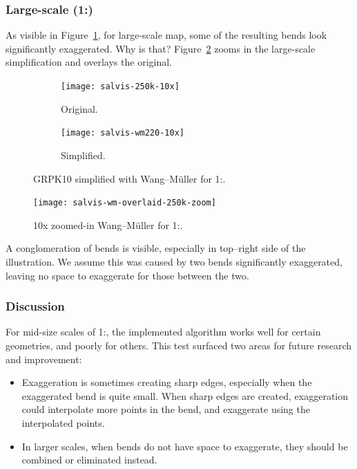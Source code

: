\documentclass[a4paper]{article}
\newcommand{\WM}{Wang--M{\"u}ller}
\begin{document}
\clearpage

\subsubsection{Large-scale (1:)}
\label{sec:analyzed-large-scale}

As visible in Figure~\ref{fig:salvis-wm220-10x}, for large-scale map, some of the
resulting bends look significantly exaggerated. Why is that?
Figure~\ref{fig:salvis-wm220-overlaid-zoom} zooms in the large-scale
simplification and overlays the original.

\begin{figure}[ht]
    \centering
    \begin{subfigure}[b]{.49\textwidth}
        \centering
        \texttt{[image: salvis-250k-10x]}
        \caption{Original.}
    \end{subfigure}
    \hfill
    \begin{subfigure}[b]{.49\textwidth}
        \centering
        \texttt{[image: salvis-wm220-10x]}
        \caption{Simplified.}
    \end{subfigure}
    \caption{GRPK10 simplified with {\WM} for 1:.}
    \label{fig:salvis-wm220-10x}
\end{figure}

\begin{figure}[ht]
    \centering
    \texttt{[image: salvis-wm-overlaid-250k-zoom]}
    \caption{10x zoomed-in {\WM} for 1:.}
    \label{fig:salvis-wm220-overlaid-zoom}
\end{figure}

A conglomeration of bends is visible, especially in top--right side of the
illustration. We assume this was caused by two bends significantly exaggerated,
leaving no space to exaggerate for those between the two.

\subsubsection{Discussion}

For mid-size scales of 1:, the implemented algorithm works well
for certain geometries, and poorly for others. This test surfaced two areas for
future research and improvement:

\begin{itemize}

    \item Exaggeration is sometimes creating sharp edges, especially when the
        exaggerated bend is quite small. When sharp edges are created,
        exaggeration could interpolate more points in the bend, and exaggerate
        using the interpolated points.

    \item In larger scales, when bends do not have space to exaggerate, they
        should be combined or eliminated instead.

\end{itemize}
\end{document}
